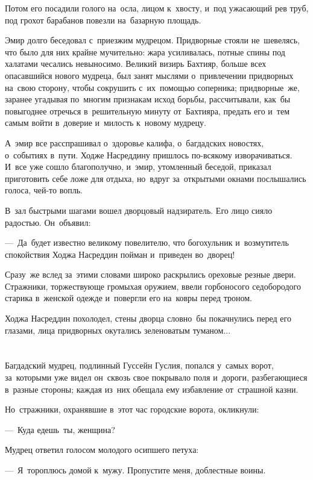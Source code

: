 \documentclass[12pt,a4paper]{book}
\begin{document}
Потом его посадили голого на~осла, лицом к~хвосту, и~под ужасающий рев труб, под грохот барабанов повезли на~базарную площадь.

Эмир долго беседовал с~приезжим мудрецом. Придворные стояли не~шевелясь, что было для них крайне мучительно: жара усиливалась, потные спины под халатами чесались невыносимо. Великий визирь Бахтияр, больше всех опасавшийся нового мудреца, был занят мыслями о~привлечении придворных на~свою сторону, чтобы сокрушить с~их~помощью соперника; придворные~же, заранее угадывая по~многим признакам исход борьбы, рассчитывали, как~бы повыгоднее отречься в~решительную минуту от~Бахтияра, предать его и~тем самым войти в~доверие и~милость к~новому мудрецу.

А~эмир все расспрашивал о~здоровье калифа, о~багдадских новостях, о~событиях в~пути. Ходже Насреддину пришлось по-всякому изворачиваться. И~все уже сошло благополучно, и~эмир, утомленный беседой, приказал приготовить себе ложе для отдыха, но~вдруг за~открытыми окнами послышались голоса, чей-то вопль.

В~зал быстрыми шагами вошел дворцовый надзиратель. Его лицо сияло радостью. Он~объявил:

—~Да~будет известно великому повелителю, что богохульник и~возмутитель спокойствия Ходжа Насреддин пойман и~приведен во~дворец!

Сразу~же вслед за~этими словами широко раскрылись ореховые резные двери. Стражники, торжествующе громыхая оружием, ввели горбоносого седобородого старика в~женской одежде и~повергли его на~ковры перед троном.

Ходжа Насреддин похолодел, стены дворца словно~бы покачнулись перед его глазами, лица придворных окутались зеленоватым туманом...


\chapter{}

Багдадский мудрец, подлинный Гуссейн Гуслия, попался у~самых ворот, за~которыми уже видел он~сквозь свое покрывало поля и~дороги, разбегающиеся в~разные стороны; каждая из~них обещала ему избавление от~страшной казни.

Но~стражники, охранявшие в~этот час городские ворота, окликнули:

—~Куда едешь~ты, женщина?

Мудрец ответил голосом молодого осипшего петуха:

—~Я~тороплюсь домой к~мужу. Пропустите меня, доблестные воины.
\end{document}
